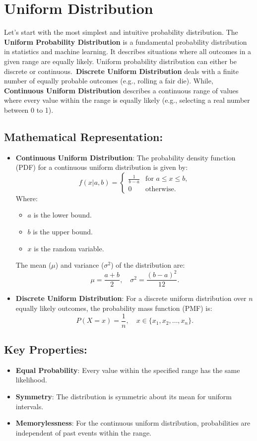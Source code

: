 \section{Uniform Distribution}
Let's start with the most simplest and intuitive probability distribution. The \textbf{Uniform Probability Distribution} is a fundamental probability distribution in statistics and machine learning. It describes situations where all outcomes in a given range are equally likely. Uniform probability distribution can either be discrete or continuous.\ \textbf{Discrete Uniform Distribution} deals with a finite number of equally probable outcomes (e.g., rolling a fair die). While, \textbf{Continuous Uniform Distribution} describes a continuous range of values where every value within the range is equally likely (e.g., selecting a real number between 0 to 1).

\subsection*{Mathematical Representation:}
\begin{itemize}
    \item \textbf{Continuous Uniform Distribution}: The probability density function (PDF) for a continuous uniform distribution is given by:
    \[
        f(x | a, b) =
        \begin{cases}
        \frac{1}{b-a} & \text{for } a \leq x \leq b, \\
        0 & \text{otherwise}.
        \end{cases}
    \]
    Where:
    \begin{itemize}
        \item $a$ is the lower bound.
        \item $b$ is the upper bound.
        \item $x$ is the random variable.
    \end{itemize}
    The mean ($\mu$) and variance ($\sigma^2$) of the distribution are:
    \[
        \mu = \frac{a + b}{2}, \quad \sigma^2 = \frac{{(b - a)}^2}{12}.
    \]
    \item \textbf{Discrete Uniform Distribution}: For a discrete uniform distribution over $n$ equally likely outcomes, the probability mass function (PMF) is:
    \[
        P(X = x) = \frac{1}{n}, \quad x \in \{x_1, x_2, \dots, x_n\}.
    \]
\end{itemize}

\subsection*{Key Properties:}
\begin{itemize}
    \item \textbf{Equal Probability}: Every value within the specified range has the same likelihood.
    \item \textbf{Symmetry}: The distribution is symmetric about its mean for uniform intervals.
    \item \textbf{Memorylessness}: For the continuous uniform distribution, probabilities are independent of past events within the range.
\end{itemize}

